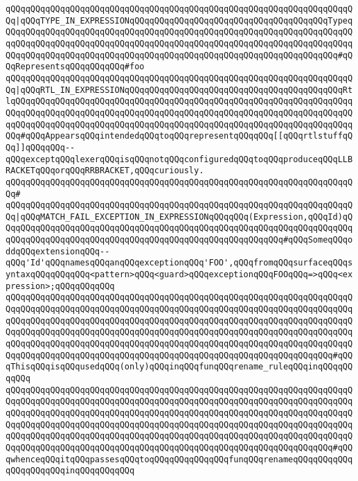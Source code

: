 \verb|qQQqqQQqqQQqqQQqqQQqqQQqqQQqqQQqqQQqqQQqqQQqqQQqqQQqqQQqqQQqqQQqqQQqqQQq|\verb#|qQQqTYPE_IN_EXPRESSIONqQQqqQQqqQQqqQQqqQQqqQQqqQQqqQQqqQQqqQQqTypeqQQqqQQqqQQqqQQqqQQqqQQqqQQqqQQqqQQqqQQqqQQqqQQqqQQqqQQqqQQqqQQqqQQqqQQqqQQqqQQqqQQqqQQqqQQqqQQqqQQqqQQqqQQqqQQqqQQqqQQqqQQqqQQqqQQqqQQqqQQqqQQqqQQqqQQqqQQqqQQqqQQqqQQqqQQqqQQqqQQqqQQqqQQqqQQqqQQqqQQqqQQqqQQq#\verb|#qQQqRepresentsqQQqqQQqqQQq#foo|\newline
\verb|qQQqqQQqqQQqqQQqqQQqqQQqqQQqqQQqqQQqqQQqqQQqqQQqqQQqqQQqqQQqqQQqqQQqqQQq|\verb#|qQQqRTL_IN_EXPRESSIONqQQqqQQqqQQqqQQqqQQqqQQqqQQqqQQqqQQqqQQqqQQqRtlqQQqqQQqqQQqqQQqqQQqqQQqqQQqqQQqqQQqqQQqqQQqqQQqqQQqqQQqqQQqqQQqqQQqqQQqqQQqqQQqqQQqqQQqqQQqqQQqqQQqqQQqqQQqqQQqqQQqqQQqqQQqqQQqqQQqqQQqqQQqqQQqqQQqqQQqqQQqqQQqqQQqqQQqqQQqqQQqqQQqqQQqqQQqqQQqqQQqqQQqqQQqqQQqqQQq#\verb|#qQQqAppearsqQQqintendedqQQqtoqQQqrepresentqQQqqQQq[[qQQqrtlstuffqQQq]]qQQqqQQq--qQQqexceptqQQqlexerqQQqisqQQqnotqQQqconfiguredqQQqtoqQQqproduceqQQqLLBRACKETqQQqorqQQqRRBRACKET,qQQqcuriously.|\newline
\verb|qQQqqQQqqQQqqQQqqQQqqQQqqQQqqQQqqQQqqQQqqQQqqQQqqQQqqQQqqQQqqQQqqQQqqQQq#|\newline
\verb|qQQqqQQqqQQqqQQqqQQqqQQqqQQqqQQqqQQqqQQqqQQqqQQqqQQqqQQqqQQqqQQqqQQqqQQq|\verb#|qQQqMATCH_FAIL_EXCEPTION_IN_EXPRESSIONqQQqqQQq(Expression,qQQqId)qQQqqQQqqQQqqQQqqQQqqQQqqQQqqQQqqQQqqQQqqQQqqQQqqQQqqQQqqQQqqQQqqQQqqQQqqQQqqQQqqQQqqQQqqQQqqQQqqQQqqQQqqQQqqQQqqQQqqQQqqQQqqQQq#\verb|#qQQqSomeqQQqoddqQQqextensionqQQq--qQQq'Id'qQQqnamesqQQqanqQQqexceptionqQQq'FOO',qQQqfromqQQqsurfaceqQQqsyntaxqQQqqQQqqQQq<pattern>qQQq<guard>qQQqexceptionqQQqFOOqQQq=>qQQq<expression>;qQQqqQQqqQQq|\newline
\verb|qQQqqQQqqQQqqQQqqQQqqQQqqQQqqQQqqQQqqQQqqQQqqQQqqQQqqQQqqQQqqQQqqQQqqQQqqQQqqQQqqQQqqQQqqQQqqQQqqQQqqQQqqQQqqQQqqQQqqQQqqQQqqQQqqQQqqQQqqQQqqQQqqQQqqQQqqQQqqQQqqQQqqQQqqQQqqQQqqQQqqQQqqQQqqQQqqQQqqQQqqQQqqQQqqQQqqQQqqQQqqQQqqQQqqQQqqQQqqQQqqQQqqQQqqQQqqQQqqQQqqQQqqQQqqQQqqQQqqQQqqQQqqQQqqQQqqQQqqQQqqQQqqQQqqQQqqQQqqQQqqQQqqQQqqQQqqQQqqQQqqQQqqQQqqQQqqQQqqQQqqQQqqQQqqQQqqQQqqQQqqQQqqQQqqQQqqQQqqQQqqQQqqQQqqQQqqQQq#qQQqThisqQQqisqQQqusedqQQq(only)qQQqinqQQqfunqQQqrename_ruleqQQqinqQQqqQQqqQQq|\newline
\verb|qQQqqQQqqQQqqQQqqQQqqQQqqQQqqQQqqQQqqQQqqQQqqQQqqQQqqQQqqQQqqQQqqQQqqQQqqQQqqQQqqQQqqQQqqQQqqQQqqQQqqQQqqQQqqQQqqQQqqQQqqQQqqQQqqQQqqQQqqQQqqQQqqQQqqQQqqQQqqQQqqQQqqQQqqQQqqQQqqQQqqQQqqQQqqQQqqQQqqQQqqQQqqQQqqQQqqQQqqQQqqQQqqQQqqQQqqQQqqQQqqQQqqQQqqQQqqQQqqQQqqQQqqQQqqQQqqQQqqQQqqQQqqQQqqQQqqQQqqQQqqQQqqQQqqQQqqQQqqQQqqQQqqQQqqQQqqQQqqQQqqQQqqQQqqQQqqQQqqQQqqQQqqQQqqQQqqQQqqQQqqQQqqQQqqQQqqQQqqQQqqQQqqQQqqQQqqQQq#qQQqwhenceqQQqitqQQqpassesqQQqtoqQQqqQQqqQQqqQQqfunqQQqrenameqQQqqQQqqQQqqQQqqQQqqQQqinqQQqqQQqqQQq|\newline
